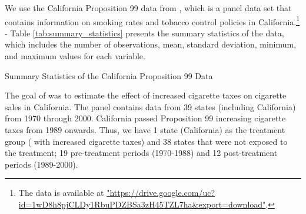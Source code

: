 We use the California Proposition 99 data from \textcite{abadie2010synthetic}, which is a panel data set that contains information on smoking rates and tobacco control policies in California.\footnote{The
data is available at \url{"https://drive.google.com/uc?id=1wD8h8pjCLDy1RbuPDZBSa3zH45TZL7ha&export=download"}.}
 - Table \ref{tab:summary_statistics} presents the summary statistics of the data, which includes the number of observations, mean, standard deviation, minimum, and maximum values for each variable.

\begin{table}[htbp]
    \centering
    
    \caption{Summary Statistics of the California Proposition 99 Data}
    \label{tab:summary_statistics}
\end{table}


The goal of \textcite{abadie2010synthetic} was to estimate the effect of increased cigarette taxes on cigarette sales in California. The panel contains data from 39 states (including California) from 1970 through 2000.
 California passed Proposition 99 increasing cigarette taxes from 1989 onwards. Thus, we have 1 state (California) as the treatment group ( with increased cigarette taxes) and 38 states that were not exposed to the treatment; 19 pre-treatment periods (1970-1988) and 12 post-treatment periods (1989-2000).

 